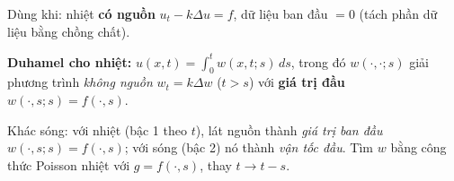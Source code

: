 \begin{dieukienbox}
Dùng khi: nhiệt \textbf{có nguồn} $u_t-k\Delta u=f$, dữ liệu ban đầu $=0$ (tách phần dữ liệu bằng chồng chất).
\end{dieukienbox}

\begin{nhobox}
\textbf{Duhamel cho nhiệt:} $\displaystyle u(x,t)=\int_0^t w(x,t;s)\,ds$, trong đó $w(\cdot,\cdot;s)$ giải
phương trình \emph{không nguồn} $w_t=k\Delta w$ ($t>s$) với \textbf{giá trị đầu} $w(\cdot,s;s)=f(\cdot,s)$.
\end{nhobox}

\begin{luuybox}
Khác sóng: với nhiệt (bậc 1 theo $t$), lát nguồn thành \emph{giá trị ban đầu} $w(\cdot,s;s)=f(\cdot,s)$;
với sóng (bậc 2) nó thành \emph{vận tốc đầu}. Tìm $w$ bằng công thức Poisson nhiệt với $g=f(\cdot,s)$, thay $t\to t-s$.
\end{luuybox}